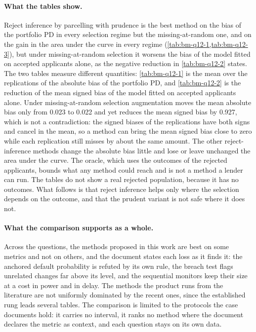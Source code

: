 \paragraph{What the tables show.} Reject inference by parcelling with prudence is the best method on the bias of the portfolio PD in every selection regime but the missing-at-random one, and on the gain in the area under the curve in every regime (\cref{tab:bm-q12-1,tab:bm-q12-3}), but under missing-at-random selection it worsens the bias of the model fitted on accepted applicants alone, as the negative reduction in \cref{tab:bm-q12-2} states. The two tables measure different quantities: \cref{tab:bm-q12-1} is the mean over the replications of the absolute bias of the portfolio PD, and \cref{tab:bm-q12-2} is the reduction of the mean signed bias of the model fitted on accepted applicants alone. Under missing-at-random selection augmentation moves the mean absolute bias only from 0.023 to 0.022 and yet reduces the mean signed bias by 0.927, which is not a contradiction: the signed biases of the replications have both signs and cancel in the mean, so a method can bring the mean signed bias close to zero while each replication still misses by about the same amount. The other reject-inference methods change the absolute bias little and lose or leave unchanged the area under the curve. The oracle, which uses the outcomes of the rejected applicants, bounds what any method could reach and is not a method a lender can run. The tables do not show a real rejected population, because it has no outcomes. What follows is that reject inference helps only where the selection depends on the outcome, and that the prudent variant is not safe where it does not.



\paragraph{What the comparison supports as a whole.} Across the questions, the methods proposed in this work are best on some metrics and not on others, and the document states each loss as it finds it: the anchored default probability is refuted by its own rule, the breach test flags unrelated changes far above its level, and the sequential monitors keep their size at a cost in power and in delay. The methods the product runs from the literature are not uniformly dominated by the recent ones, since the established rung leads several tables. The comparison is limited to the protocols the case documents hold: it carries no interval, it ranks no method where the document declares the metric as context, and each question stays on its own data.
